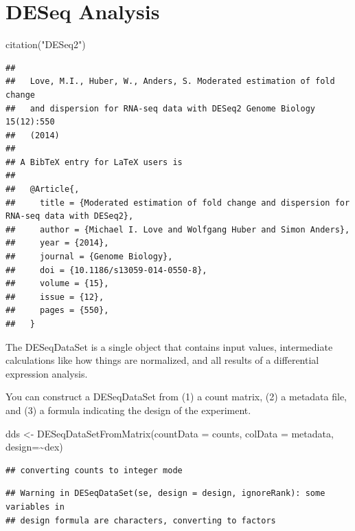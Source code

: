 \documentclass[
]{article}
\newenvironment{Shaded}{\begin{snugshade}}{\end{snugshade}}
\newcommand{\AttributeTok}[1]{\textcolor[rgb]{0.77,0.63,0.00}{#1}}
\newcommand{\FunctionTok}[1]{\textcolor[rgb]{0.00,0.00,0.00}{#1}}
\newcommand{\NormalTok}[1]{#1}
\newcommand{\OtherTok}[1]{\textcolor[rgb]{0.56,0.35,0.01}{#1}}
\newcommand{\SpecialCharTok}[1]{\textcolor[rgb]{0.00,0.00,0.00}{#1}}
\newcommand{\StringTok}[1]{\textcolor[rgb]{0.31,0.60,0.02}{#1}}
\begin{document}
\hypertarget{deseq-analysis}{%
\section{DESeq Analysis}\label{deseq-analysis}}

\begin{Shaded}
\begin{Highlighting}[]
\FunctionTok{citation}\NormalTok{(}\StringTok{"DESeq2"}\NormalTok{)}
\end{Highlighting}
\end{Shaded}

\begin{verbatim}
## 
##   Love, M.I., Huber, W., Anders, S. Moderated estimation of fold change
##   and dispersion for RNA-seq data with DESeq2 Genome Biology 15(12):550
##   (2014)
## 
## A BibTeX entry for LaTeX users is
## 
##   @Article{,
##     title = {Moderated estimation of fold change and dispersion for RNA-seq data with DESeq2},
##     author = {Michael I. Love and Wolfgang Huber and Simon Anders},
##     year = {2014},
##     journal = {Genome Biology},
##     doi = {10.1186/s13059-014-0550-8},
##     volume = {15},
##     issue = {12},
##     pages = {550},
##   }
\end{verbatim}

The DESeqDataSet is a single object that contains input values,
intermediate calculations like how things are normalized, and all
results of a differential expression analysis.

You can construct a DESeqDataSet from (1) a count matrix, (2) a metadata
file, and (3) a formula indicating the design of the experiment.

\begin{Shaded}
\begin{Highlighting}[]
\NormalTok{dds }\OtherTok{\textless{}{-}} \FunctionTok{DESeqDataSetFromMatrix}\NormalTok{(}\AttributeTok{countData =}\NormalTok{ counts, }
                              \AttributeTok{colData =}\NormalTok{ metadata, }
                              \AttributeTok{design=}\SpecialCharTok{\textasciitilde{}}\NormalTok{dex)}
\end{Highlighting}
\end{Shaded}

\begin{verbatim}
## converting counts to integer mode
\end{verbatim}

\begin{verbatim}
## Warning in DESeqDataSet(se, design = design, ignoreRank): some variables in
## design formula are characters, converting to factors
\end{verbatim}
\end{document}
